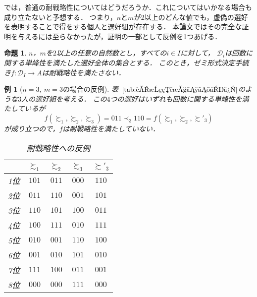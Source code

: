 \documentclass[dvipdfmx]{jsarticle}
\newtheorem{proposition}[definition]{命題}
\newtheorem{example}{例}[section]
\begin{document}
  では，普通の耐戦略性についてはどうだろうか．これについてはいかなる場合も成り立たないと予想する．
  つまり，$n$と$m$が2以上のどんな値でも，虚偽の選好を表明することで得をする個人と選好組が存在する．
  本論文ではその完全な証明を与えるには至らなかったが，証明の一部として反例を1つあげる．

  \begin{proposition}
    $n$，$m$を$2$以上の任意の自然数とし，すべての$i \in I$に対して，
    $\mathcal{D}_i$は回数に関する単峰性を満たした選好全体の集合とする．
    このとき，ゼミ形式決定手続き$f\colon \mathcal{D}_I \to A$は耐戦略性を満たさない．
  \end{proposition}

  \begin{example}[$n=3,\ m=3$の場合の反例]
    表~$\ref{tab:耐戦略性への反例}$のような$3$人の選好組を考える．
    この$4$つの選好はいずれも回数に関する単峰性を満たしているが
    \begin{equation*}
      f(\succsim_1, \succsim_2, \succsim_3) = 011
      \prec_3
      110 = f(\succsim_1, \succsim_2, \succsim'_3) 
    \end{equation*}
    が成り立つので，$f$は耐戦略性を満たしていない．
    \begin{table}[h]
      \caption{耐戦略性への反例}\label{tab:耐戦略性への反例}
      \begin{center}
        \begin{tabular}{c|c|c|c|c}\hline
            & $\succsim_1$ & $\succsim_2$ & $\succsim_3$ & $\succsim'_3$\\ \hline
          1位 & $101$ & $011$ & $000$ & $110$ \\
          2位 & $011$ & $110$ & $001$ & $101$ \\
          3位 & $110$ & $101$ & $100$ & $011$ \\
          4位 & $100$ & $111$ & $010$ & $111$ \\
          5位 & $010$ & $001$ & $110$ & $100$ \\
          6位 & $001$ & $010$ & $101$ & $010$ \\
          7位 & $111$ & $100$ & $011$ & $001$ \\
          8位 & $000$ & $000$ & $111$ & $000$ \\ \hline
        \end{tabular}
      \end{center}
    \end{table}
  \end{example}
\end{document}
